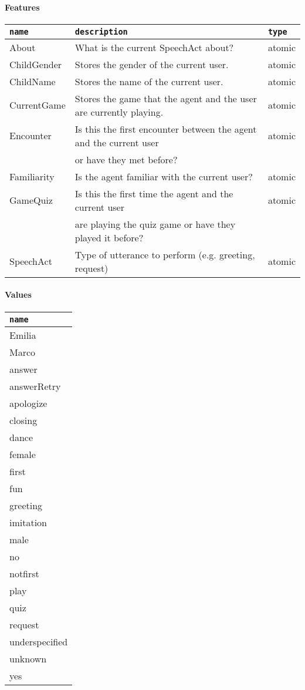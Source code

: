 \documentclass[11pt]{article}
\begin{document}
\paragraph{Features}
\label{sec-3-4-1-1}
\begin{center}
\begin{tabular}{lll}
\hline
\texttt{name} & \texttt{description} & \texttt{type}\\
\hline
About & What is the current SpeechAct about? & atomic\\
ChildGender & Stores the gender of the current user. & atomic\\
ChildName & Stores the name of the current user. & atomic\\
CurrentGame & Stores the game that the agent and the user are currently playing. & atomic\\
Encounter & Is this the first encounter between the agent and the current user & atomic\\
 & or have they met before? & \\
Familiarity & Is the agent familiar with the current user? & atomic\\
GameQuiz & Is this the first time the agent and the current user & atomic\\
 & are playing the quiz game or have they played it before? & \\
SpeechAct & Type of utterance to perform (e.g. greeting, request) & atomic\\
\hline
\end{tabular}
\end{center}

\paragraph{Values}
\label{sec-3-4-1-2}
\begin{center}
\begin{tabular}{l}
\hline
\texttt{name}\\
\hline
Emilia\\
Marco\\
answer\\
answerRetry\\
apologize\\
closing\\
dance\\
female\\
first\\
fun\\
greeting\\
imitation\\
male\\
no\\
notfirst\\
play\\
quiz\\
request\\
underspecified\\
unknown\\
yes\\
\hline
\end{tabular}
\end{center}
\end{document}
